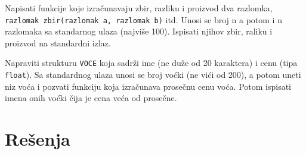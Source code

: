  
\begin{Exercise}[label=p2.5_] 
Napisati funkcije koje izra\v cunavaju zbir, razliku i proizvod dva
razlomka, \verb|razlomak zbir(razlomak a, razlomak b)| itd. Unosi se
broj n a potom i n razlomaka sa standarnog ulaza (najvi\v se
100). Ispisati njihov zbir, raliku i proizvod na standardni izlaz.
\end{Exercise}
\begin{Answer}[ref=p2.5_]
\end{Answer}


\begin{Exercise}[label=p2.5_] 
Napraviti strukturu \verb|VOCE|
koja sadr\v zi ime (ne du\v ze od 20 karaktera)
i cenu (tipa \verb|float|). Sa standardnog ulaza unosi se broj vo\' cki (ne vi\' ci od 200), a
potom uneti niz vo\' ca i pozvati funkciju koja izra\v cunava prose\v cnu cenu vo\'ca.
Potom ispisati imena onih vo\'cki \v cija je cena ve\' ca od prose\v cne.
\end{Exercise}
\begin{Answer}[ref=p2.5_]
\end{Answer}




\section{Rešenja}
\shipoutAnswer


